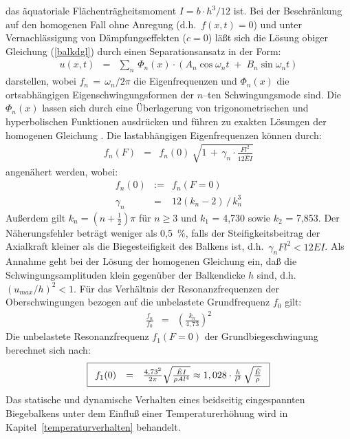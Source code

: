das äquatoriale Flächenträgheitsmoment $I = b \cdot h^{3} / 12$ ist.
Bei der Beschränkung auf den homogenen Fall ohne Anregung
(d.h.\ $f(x,t) = 0$) und unter Vernachlässigung von Dämpfungseffekten
($c = 0$) läßt sich die Lösung obiger Gleichung (\ref{balkdgl}) durch einen
Separationsansatz in der Form:
%
\begin{eqnarray}
  u(x,t) & = & \sum_{n} \, \Phi_{n}(x) \cdot \left
  ( A_{n} \cos \omega_{n}t \; + \; B_{n} \sin \omega _{n} t \right )
\end{eqnarray}
%
darstellen, wobei $f_{n} \, = \, \omega_{n}/{2\pi}$ die Eigenfrequenzen
und $\Phi_{n}(x)$ die ortsabhängigen Eigenschwingungsformen der $n$--ten
Schwingungsmode sind. Die $\Phi_{n}(x)$ lassen sich durch eine
Überlagerung von trigonometrischen und hyperbolischen Funktionen
ausdrücken und führen zu exakten Lösungen der homogenen Gleichung
\cite{Bou91}. Die lastabhängigen Eigenfrequenzen können durch:
%
\begin{eqnarray}
\label{freqF}
f_{n}(F) & = & f_{n}(0) \: \sqrt{ 1 \, + \, \gamma_{n} \cdot
               \frac{Fl^{2}}{12 \hat E I}}
\end{eqnarray}
%
angenähert werden, wobei:
\begin{eqnarray*}
        f_{n}(0)   & := & f_{n}(F=0) \nonumber \\
        \gamma_{n} & = & 12(k_{n} - 2) \, / \, k_{n}^{3}
\end{eqnarray*}
Außerdem gilt $k_{n} = (n + \frac{1}{2}) \pi$ für $n \geq 3$ und
$k_{1}$ = 4,730 sowie $k_{2}$ = 7,853.
Der Näherungsfehler beträgt weniger als 0,5~\%, falls der Steifigkeitsbeitrag
der Axialkraft kleiner als die Biegesteifigkeit des Balkens ist, d.h.\
$\gamma_{n} Fl^{2} < 12 \hat E I$. Als Annahme geht bei der Lösung
der homogenen Gleichung            %
ein, daß die Schwingungsamplituden klein
gegenüber der Balkendicke $h$ sind, d.h.\ $(u_{max}/h)^2 < 1$. Für das
Verhältnis der Resonanzfrequenzen der Oberschwingungen bezogen auf die
unbelastete Grundfrequenz $f_{0}$ gilt:
%
\begin{eqnarray}
        \frac {f_{n}}{f_{0}} & = & \left( \frac{k_{n}}{4,73} \right)^2
\end{eqnarray}
%
Die unbelastete Resonanzfrequenz $f_{1}(F = 0)$ der Grundbiegeschwingung
berechnet sich nach:
%
\begin{equation}
\label{balkfreq}
\fbox{$
 \displaystyle
 \begin{array}{rcl}
    f_{1}(0) & = & \frac{ {4,73}^{2} }{2 \pi}
        \sqrt{ \frac{ \hat E I}{\rho A l^{4}}}
        \approx 1,028 \cdot \frac {h}{l^{2}} \, \sqrt{ \frac{\hat E}{\rho}}
 \end{array}
 $}
\end{equation}
%
Das statische und dynamische Verhalten eines beidseitig eingespannten
Biegebalkens unter dem Einfluß einer Temperaturerhöhung wird in
Kapitel~\ref{temperaturverhalten} behandelt.


